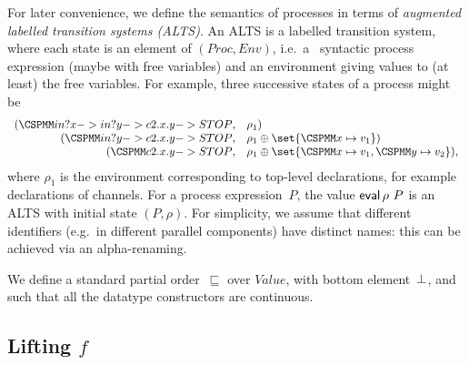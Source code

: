 For later convenience, we define the semantics of processes in terms of
\emph{augmented labelled transition systems (ALTS)}.  An ALTS is a labelled
transition system, where each state is an element of $(Proc, Env)$, i.e.~a
\CSPm\ syntactic process expression (maybe with free variables) and an
environment giving values to (at least) the free variables.  For example,
three successive states of a process might be
\[
\begin{array}{rl}
(\M{in?x -> in?y -> c2.x.y -> STOP}, & \rho_1) \\
(\M{in?y -> c2.x.y -> STOP}, & \rho_1 \oplus \set{\M{x} \mapsto v_1}) \\
(\M{c2.x.y -> STOP}, & \rho_1 \oplus \set{\M x \mapsto v_1, \M y \mapsto v_2}),
\end{array}
\]
where $\rho_1$ is the environment corresponding to top-level declarations, for
example declarations of channels.  For a process expression~$P$, the value
$\mathop{\sf eval} \rho~P$ is an ALTS with initial state $(P,\rho)$.  For simplicity, we
assume that different identifiers (e.g.~in different parallel components) have
distinct names: this can be achieved via an alpha-renaming.

We define a standard partial order~$\sqsubseteq$ over $Value$, with bottom
element~$\perp$, and such that all the datatype constructors are continuous.



\subsection{Lifting $f$}

